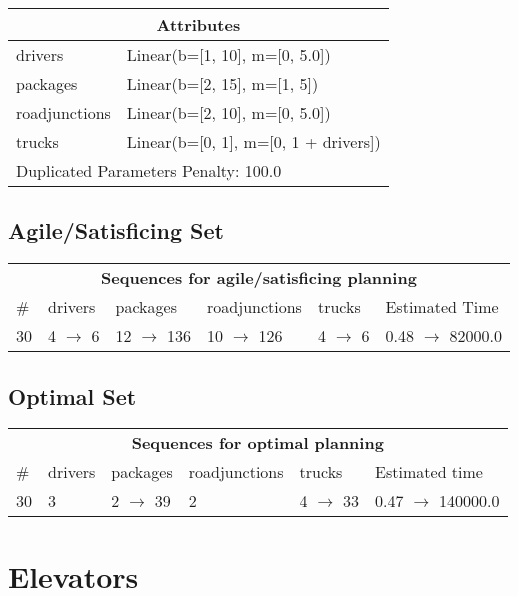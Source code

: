 \documentclass{article}
\begin{document}
                    \begin{center}
                    \begin{tabular}{p{}p{}}
                    \multicolumn{2}{c}{\bf \large Attributes}\\\midrule
                    drivers & Linear(b=[1, 10], m=[0, 5.0])\\
packages & Linear(b=[2, 15], m=[1, 5])\\
roadjunctions & Linear(b=[2, 10], m=[0, 5.0])\\
trucks & Linear(b=[0, 1], m=[0, 1 + drivers])
                    
                     \\\midrule
                    \multicolumn{2}{l}{Duplicated Parameters Penalty: 100.0}
                    \end{tabular}
                    \end{center}
                
                         \subsection*{Agile/Satisficing Set}

                        \begin{center}
                        \begin{tabular}{l|l|l|l|l|l}
                        \multicolumn{6}{c}{\bf \large Sequences for agile/satisficing planning}\\
                        \# & drivers & packages & roadjunctions & trucks & Estimated Time\\\midrule
                        30&4 $\rightarrow$ 6&12 $\rightarrow$ 136&10 $\rightarrow$ 126&4 $\rightarrow$ 6&0.48 $\rightarrow$ 82000.0
                        \end{tabular}
                        \end{center}
                    
                            \subsection*{Optimal Set}

                            \begin{center}
                            \begin{tabular}{l|l|l|l|l|l}
                            \multicolumn{6}{c}{\bf \large Sequences for optimal planning}\\
                            \# & drivers & packages & roadjunctions & trucks & Estimated time\\\midrule
                            30&3&2 $\rightarrow$ 39&2&4 $\rightarrow$ 33&0.47 $\rightarrow$ 140000.0
                            \end{tabular}
                            \end{center}
                    \newpage \section{Elevators}
\end{document}
